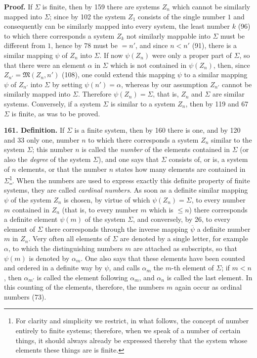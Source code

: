\documentclass[11pt]{article}
\newcommand{\Mf}{\mathfrak{M}}
\begin{document}
\noindent\textbf{Proof.} If $\Sigma$ is finite, then by 159 there are systems $Z_n$ which cannot be similarly mapped into $\Sigma$; since by 102 the system $Z_1$ consists of the single number $1$ and consequently can be similarly mapped into every system, the least number $k$ (96) to which there corresponds a system $Z_k$ not similarly mappable into $\Sigma$ must be different from $1$, hence by 78 must be $=n'$, and since $n<n'$ (91), there is a similar mapping $\psi$ of $Z_n$ into $\Sigma$. If now $\psi(Z_n)$ were only a proper part of $\Sigma$, so that there were an element $\alpha$ in $\Sigma$ which is not contained in $\psi(Z_n)$, then, since $Z_{n'}=\Mf(Z_n,n')$ (108), one could extend this mapping $\psi$ to a similar mapping $\psi$ of $Z_{n'}$ into $\Sigma$ by setting $\psi(n')=\alpha$, whereas by our assumption $Z_{n'}$ cannot be similarly mapped into $\Sigma$. Therefore $\psi(Z_n)=\Sigma$, that is, $Z_n$ and $\Sigma$ are similar systems. Conversely, if a system $\Sigma$ is similar to a system $Z_n$, then by 119 and 67 $\Sigma$ is finite, as was to be proved.

\noindent\textbf{161. Definition.} If $\Sigma$ is a finite system, then by 160 there is one, and by 120 and 33 only one, number $n$ to which there corresponds a system $Z_n$ similar to the system $\Sigma$; this number $n$ is called the \emph{number} of the elements contained in $\Sigma$ (or also the \emph{degree} of the system $\Sigma$), and one says that $\Sigma$ consists of, or is, a system of $n$ elements, or that the number $n$ states how many elements are contained in $\Sigma$\footnote{For clarity and simplicity we restrict, in what follows, the concept of number entirely to finite systems; therefore, when we speak of a number of certain things, it should always already be expressed thereby that the system whose elements these things are is finite.}. When the numbers are used to express exactly this definite property of finite systems, they are called \emph{cardinal numbers}. As soon as a definite similar mapping $\psi$ of the system $Z_n$ is chosen, by virtue of which $\psi(Z_n)=\Sigma$, to every number $m$ contained in $Z_n$ (that is, to every number $m$ which is $\leq n$) there corresponds a definite element $\psi(m)$ of the system $\Sigma$, and conversely, by 26, to every element of $\Sigma$ there corresponds through the inverse mapping $\overline{\psi}$ a definite number $m$ in $Z_n$. Very often all elements of $\Sigma$ are denoted by a single letter, for example $\alpha$, to which the distinguishing numbers $m$ are attached as subscripts, so that $\psi(m)$ is denoted by $\alpha_m$. One also says that these elements have been counted and ordered in a definite way by $\psi$, and calls $\alpha_m$ the $m$-th element of $\Sigma$; if $m<n$, then $\alpha_{m'}$ is called the element following $\alpha_m$, and $\alpha_n$ is called the last element. In this counting of the elements, therefore, the numbers $m$ again occur as ordinal numbers (73).
\end{document}
